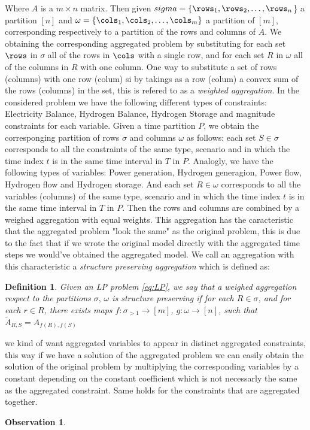 \documentclass[english]{article}
\newcommand{\gr}[2][]{\todo[color=violet!40!,#1]{\textsf{GR:} #2}}
\newtheorem{definition}{Definition}
\newtheorem{observation}[theorem]{Observation}
\numberwithin{definition}{section}
\numberwithin{theorem}{section}
\numberwithin{problem}{section}
\begin{document}
Where \(A\) is a \(m \times n\) matrix. Then given \(sigma = \{\rows_1, \rows_2, \ldots, \rows_n\)\} a partition \([n]\) and \(\omega = \{\cols_1, \cols_2, \ldots, \cols_m\}\) a partition of \([m]\), corresponding respectively to a partition of the rows and columns of \(A\).
We obtaining the corresponding aggregated problem by substituting for each set \(\rows\) in \(\sigma\) all of the rows in \(\cols\) with a single row, and for each set \(R\) in \(\omega\) all of the columns in \(R\) with one column.
One way to substitute a set of rows (columns) with one row (colum) si by takings as a row (colum) a convex sum of the rows (columns) in the set, this is refered to as a \emph{weighted aggregation}.
In the considered problem we have the following different types of constraints: Electricity Balance, Hydrogen Balance, Hydrogen Storage and magnitude constraints for each variable.
Given a time partition \(P\), we obtain the corresponging partition of rows \(\sigma\) and columns \(\omega\) as follows: each set \(S \in \sigma\) corresponds to all the constraints of the same type, scenario and in which the time index \(t\) is in the same time interval in \(T\) in \(P\).
Analogly, we have the following types of variables: Power generation, Hydrogen generagion, Power flow, Hydrogen flow and Hydrogen storage. And each set \(R \in \omega\) corresponds to all the variables (columns) of the same type, scenario and in which the time index \(t\) is in the same time interval in \(T\) in \(P\).
Then the rows and columns are combined by a weighed aggregation with equal weights. This aggregation has the caracteristic that the aggregated problem "look the same" as the original problem, this is due to the fact that if we wrote the original model directly with the aggregated time steps we would've obtained the aggregated model.
We call an aggregation with this characteristic a \emph{structure preserving aggregation} which is defined as:

\begin{definition} \gr[]{mhhh these arenot enough assumptions eheh}
  Given an LP problem \eqref{eq:LP}, we say that a weighed aggregation respect to the partitions \(\sigma,\, \omega\) is \emph{structure preserving} if for each \(R \in \sigma\), and for each \(r \in R\), there exists maps \(f: \sigma_{>1} \to [m]\), \(g: \omega \to [n]\), such that \(\tilde A_{R,S} = A_{f(R),f(S)} \) 
\end{definition}
we kind of want aggregated variables to appear in distinct aggregated constraints, this way if we have a solution of the aggregated problem we can easily obtain the solution of the original problem by multiplying the corresponding variables by a constant depending on the constant coefficient which is not necessarly the same as the aggregated constraint. 
Same holds for the constraints that are aggregated together.
\begin{observation}

\end{observation}
\vspace{1cm}
\end{document}
